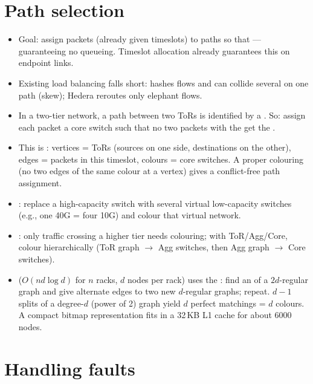 \section{Path selection}
\begin{itemize}
\item Goal: assign packets (already given timeslots) to paths so that  --- guaranteeing no queueing. Timeslot allocation already guarantees this on endpoint links.
\item Existing load balancing falls short:  hashes flows and can collide several on one path (skew); Hedera reroutes only elephant flows.
\item In a two-tier network, a path between two ToRs is identified by a . So: assign each packet a core switch such that no two packets with the  get the .
\item This is : vertices = ToRs (sources on one side, destinations on the other), edges = packets in this timeslot, colours = core switches. A proper colouring (no two edges of the same colour at a vertex) gives a conflict-free path assignment.
\end{itemize}
\begin{itemize}
\item {}: replace a high-capacity switch with several virtual low-capacity switches (e.g., one 40G = four 10G) and colour that virtual network.
\item {}: only traffic crossing a higher tier needs colouring; with ToR/Agg/Core, colour hierarchically (ToR graph $\to$ Agg switches, then Agg graph $\to$ Core switches).
\item {} ($O(nd\log d)$ for $n$ racks, $d$ nodes per rack) uses the : find an  of a $2d$-regular graph and give alternate edges to two new $d$-regular graphs; repeat. $d-1$ splits of a degree-$d$ (power of 2) graph yield $d$ perfect matchings = $d$ colours. A compact bitmap representation fits in a 32\,KB L1 cache for about 6000 nodes.
\end{itemize}

\section{Handling faults}
